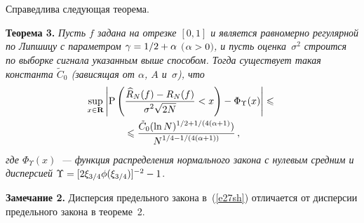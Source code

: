 \begin{multicols}{2}
Справедлива следующая теорема.

\medskip

\noindent
\textbf{Теорема 3.} \textit{Пусть $f$ задана на отрезке $[0,1]$ и 
является равномерно регулярной по Липшицу с параметром $\gamma\hm={1}/{2}\hm+\alpha$ 
$($$\alpha\hm>0$$)$, и пусть оценка~$\sigma^2$ строится по выборке сигнала указанным выше 
способом. Тогда существует такая константа $\tilde{C}_0$ (зависящая от $\alpha$, $A$ и~$\sigma$), 
что}
\begin{multline}
\sup\limits_{x\in\mathbf{R}}\left\vert\mbox{P}\left(
\displaystyle\frac{\displaystyle \widehat{R}_N(f)-R_N(f)\mathstrut}{\displaystyle \sigma^2\sqrt{2N}\mathstrut}<x\right)-
\Phi_{\Upsilon}(x)\right\vert\leqslant{}\\
{}\leqslant
\displaystyle\frac{\displaystyle \tilde{C}_0(\ln N)^{{1}/{2}+{1}/(4(\alpha+1)})\mathstrut}{\displaystyle N^{1/4-1/(4(\alpha+1))}\mathstrut}\,,\label{e27sh}
\end{multline}
\textit{где $\Phi_{\Upsilon}(x)$~--- функция распределения нормального закона 
с нулевым средним и дисперсией} $\Upsilon\hm=[2\xi_{3/4}\phi(\xi_{3/4})]^{-2}-1$.

\medskip

\noindent
\textbf{Замечание 2.} Дисперсия предельного закона в~(\ref{e27sh}) 
отличается от дисперсии предельного закона в теореме~2.

\medskip


\end{multicols}
